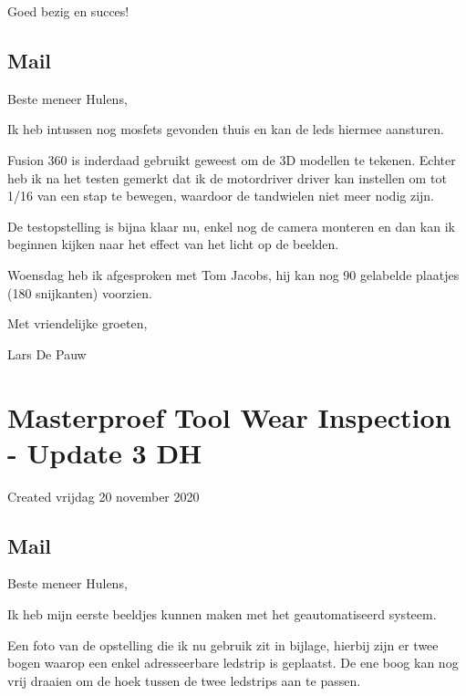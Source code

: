 \documentclass{article}
\begin{document}
Goed bezig en succes!



\subsection{Mail}

Beste meneer Hulens,

 

Ik heb intussen nog mosfets gevonden thuis en kan de leds hiermee aansturen.

 Fusion 360 is inderdaad gebruikt geweest om de 3D modellen te tekenen. Echter heb ik na het testen gemerkt dat ik de motordriver driver kan instellen om tot 1/16 van een stap te bewegen, waardoor de tandwielen niet meer nodig zijn.

 

De testopstelling is bijna klaar nu, enkel nog de camera monteren en dan kan ik beginnen kijken naar het effect van het licht op de beelden.

 

Woensdag heb ik afgesproken met Tom Jacobs, hij kan nog 90 gelabelde plaatjes (180 snijkanten) voorzien.

 

Met vriendelijke groeten,

 

Lars De Pauw


		\section{Masterproef Tool Wear Inspection - Update 3 DH}

Created vrijdag 20 november 2020



\subsection{Mail}

Beste meneer Hulens,

 

Ik heb mijn eerste beeldjes kunnen maken met het geautomatiseerd systeem.

Een foto van de opstelling die ik nu gebruik zit in bijlage, hierbij zijn er twee bogen waarop een enkel adresseerbare ledstrip is geplaatst. De ene boog kan nog vrij draaien om de hoek tussen de twee ledstrips aan te passen.
\end{document}
